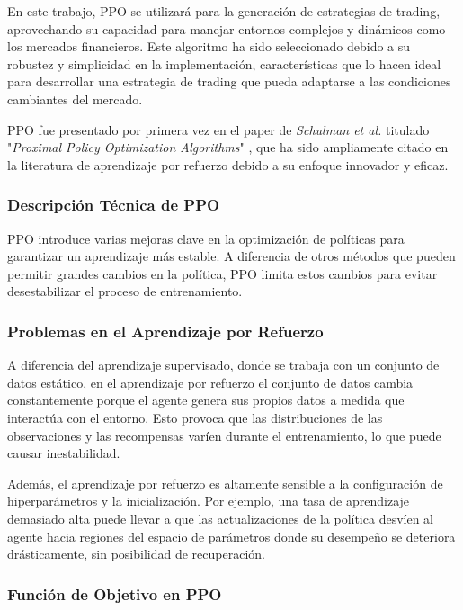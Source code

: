 \documentclass[a4paper,12pt, twoside]{report}
\begin{document}
En este trabajo, PPO se utilizará para la generación de estrategias de trading, aprovechando 
su capacidad para manejar entornos complejos y dinámicos como los mercados financieros. Este 
algoritmo ha sido seleccionado debido a su robustez y simplicidad en la implementación, 
características que lo hacen ideal para desarrollar una estrategia de trading que pueda 
adaptarse a las condiciones cambiantes del mercado.

PPO fue presentado por primera vez en el paper de \textit{Schulman et al.} titulado 
"\textit{Proximal Policy Optimization Algorithms}" \cite{Schulman2017}, que ha sido ampliamente 
citado en la literatura de aprendizaje por refuerzo debido a su enfoque innovador y eficaz.

\subsubsection{Descripción Técnica de PPO}

PPO introduce varias mejoras clave en la optimización de políticas para garantizar un 
aprendizaje más estable. A diferencia de otros métodos que pueden permitir grandes cambios 
en la política, PPO limita estos cambios para evitar desestabilizar el proceso de entrenamiento.

\subsubsection{Problemas en el Aprendizaje por Refuerzo}

A diferencia del aprendizaje supervisado, donde se trabaja con un conjunto de datos estático, 
en el aprendizaje por refuerzo el conjunto de datos cambia constantemente porque el agente 
genera sus propios datos a medida que interactúa con el entorno. Esto provoca que las 
distribuciones de las observaciones y las recompensas varíen durante el entrenamiento, 
lo que puede causar inestabilidad.

Además, el aprendizaje por refuerzo es altamente sensible a la configuración de hiperparámetros 
y la inicialización. Por ejemplo, una tasa de aprendizaje demasiado alta puede llevar a que 
las actualizaciones de la política desvíen al agente hacia regiones del espacio de parámetros 
donde su desempeño se deteriora drásticamente, sin posibilidad de recuperación.

\subsubsection{Función de Objetivo en PPO}
\end{document}
